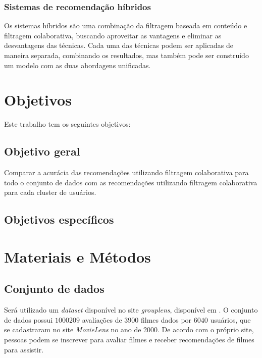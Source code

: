 \documentclass[12pt,a4paper,header]{abnt}
\begin{document}
\subsection{Sistemas de recomendação híbridos}

Os sistemas híbridos são uma combinação da filtragem baseada em conteúdo e filtragem colaborativa, buscando aproveitar as vantagens e eliminar as desvantagens das técnicas\cite{shapira2011recommender}. Cada uma das técnicas podem ser aplicadas de maneira separada, combinando os resultados, mas também pode ser construído um modelo com as duas abordagens unificadas\cite{takahashi2015estudo}.

\chapter{Objetivos}

Este trabalho tem os seguintes objetivos:

\section{Objetivo geral}

Comparar a acurácia das recomendações utilizando filtragem colaborativa para todo o conjunto de dados com as recomendações utilizando filtragem colaborativa para cada cluster de usuários.

\section{Objetivos específicos}

\chapter{Materiais e Métodos}

\section{Conjunto de dados}

Será utilizado um \textit{dataset} disponível no site \textit{grouplens}, disponível em . O conjunto de dados possui $\num{1000209}$ avaliações de $3900$ filmes dados por $6040$ usuários\cite{harper2016movielens}, que se cadastraram no site \textit{MovieLens} no ano de 2000. De acordo com o próprio site, pessoas podem se inscrever para avaliar filmes e receber recomendações de filmes para assistir.
\end{document}
